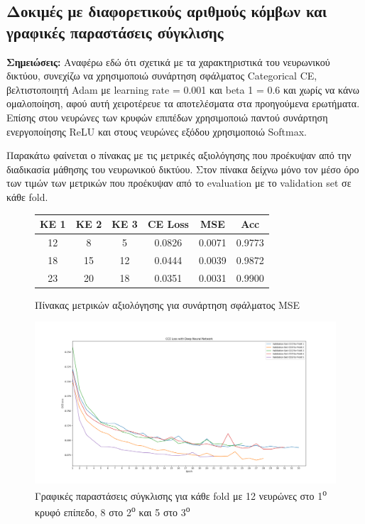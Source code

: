 \documentclass[12pt,a4paper]{article}
\begin{document}
\subsection{Δοκιμές με διαφορετικούς αριθμούς κόμβων και γραφικές παραστάσεις σύγκλισης}

\textbf{Σημειώσεις:}
Αναφέρω εδώ ότι σχετικά με τα χαρακτηριστικά του νευρωνικού δικτύου, συνεχίζω να χρησιμοποιώ συνάρτηση σφάλματος Categorical CE, βελτιστοποιητή Adam με learning rate = 0.001 και beta 1 = 0.6 και χωρίς να κάνω ομαλοποίηση, αφού αυτή χειροτέρευε τα αποτελέσματα στα προηγούμενα ερωτήματα. Επίσης στου νευρώνες των κρυφών επιπέδων χρησιμοποιώ παντού συνάρτηση ενεργοποίησης ReLU και στους νευρώνες εξόδου χρησιμοποιώ Softmax.

Παρακάτω φαίνεται ο πίνακας με τις μετρικές αξιολόγησης που προέκυψαν από την διαδικασία μάθησης του νευρωνικού δικτύου. Στον πίνακα δείχνω μόνο τον μέσο όρο των τιμών των μετρικών που προέκυψαν από το evaluation με το validation set σε κάθε fold.

\begin{figure}[H]
    \begin{center}
    \begin{tabular}{ |c|c|c|c|c|c| } 
        \hline
        \textbf{ΚΕ 1} & \textbf{ΚΕ 2} & \textbf{ΚΕ 3} & \textbf{CE Loss} & \textbf{MSE} & \textbf{Acc} \\ \hline
        12 & 8  & 5  & 0.0826 & 0.0071 & 0.9773 \\
        \hline
        18 & 15 & 12 & 0.0444 & 0.0039 & 0.9872 \\
        \hline
        23 & 20 & 18 & 0.0351 & 0.0031 & 0.9900 \\
        \hline
    \end{tabular}
    \end{center}
    \caption{Πίνακας μετρικών αξιολόγησης για συνάρτηση σφάλματος MSE}
\end{figure}

\begin{figure}[H]
	\includegraphics[width=\textwidth]{31. hidden layers 12 - 8 - 5.png}
    \caption{Γραφικές παραστάσεις σύγκλισης για κάθε fold με 12 νευρώνες στο 1\textsuperscript{ο} κρυφό επίπεδο, 8 στο 2\textsuperscript{ο} και 5 στο 3\textsuperscript{ο}}
\end{figure}
\end{document}
